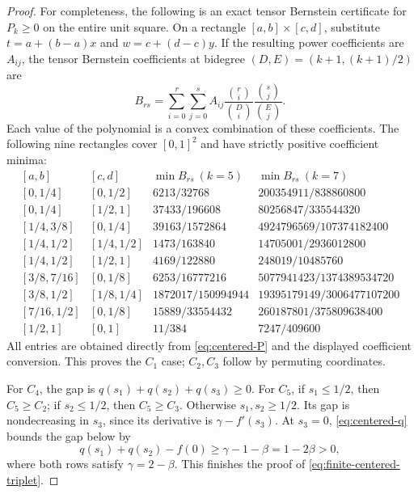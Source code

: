 \documentclass[11pt]{article}
\begin{document}
\begin{proof}
For completeness, the following is an exact tensor Bernstein
certificate for $P_k\ge0$ on the entire unit square. On a rectangle
$[a,b]\times[c,d]$, substitute $t=a+(b-a)x$ and $w=c+(d-c)y$.
If the resulting power coefficients are $A_{ij}$, the tensor
Bernstein coefficients at bidegree $(D,E)=(k+1,(k+1)/2)$ are
\[
 B_{rs}=\sum_{i=0}^{r}\sum_{j=0}^{s}
 A_{ij}\frac{\binom ri}{\binom Di}\frac{\binom sj}{\binom Ej}.
\]
Each value of the polynomial is a convex combination of these
coefficients. The following nine rectangles cover $[0,1]^2$ and have
strictly positive coefficient minima:
\[
\begin{array}{c|c|c|c}
 {}[a,b]&[c,d]&\min B_{rs}\ (k=5)&\min B_{rs}\ (k=7)\\\hline
 {}[0,1/4]&[0,1/2]&6213/32768&200354911/838860800\\
 {}[0,1/4]&[1/2,1]&37433/196608&80256847/335544320\\
 {}[1/4,3/8]&[0,1/4]&39163/1572864&4924796569/107374182400\\
 {}[1/4,1/2]&[1/4,1/2]&1473/163840&14705001/2936012800\\
 {}[1/4,1/2]&[1/2,1]&4169/122880&248019/10485760\\
 {}[3/8,7/16]&[0,1/8]&6253/16777216&5077941423/1374389534720\\
 {}[3/8,1/2]&[1/8,1/4]&1872017/150994944&19395179149/3006477107200\\
 {}[7/16,1/2]&[0,1/8]&15889/33554432&260187801/375809638400\\
 {}[1/2,1]&[0,1]&11/384&7247/409600
\end{array}
\]
All entries are obtained directly from \eqref{eq:centered-P} and
the displayed coefficient conversion. This proves the $C_1$ case;
$C_2,C_3$ follow by permuting coordinates.

For $C_4$, the gap is $q(s_1)+q(s_2)+q(s_3)\ge0$.
For $C_5$, if $s_1\le1/2$, then $C_5\ge C_2$; if $s_2\le1/2$,
then $C_5\ge C_3$. Otherwise $s_1,s_2\ge1/2$. Its gap is
nondecreasing in $s_3$, since its derivative is $\gamma-f'(s_3)$.
At $s_3=0$, \eqref{eq:centered-q} bounds the gap below by
\[
 q(s_1)+q(s_2)-f(0)\ge\gamma-1-\beta=1-2\beta>0,
\]
where both rows satisfy $\gamma=2-\beta$. This finishes the proof
of \eqref{eq:finite-centered-triplet}.


\end{proof}
\end{document}

